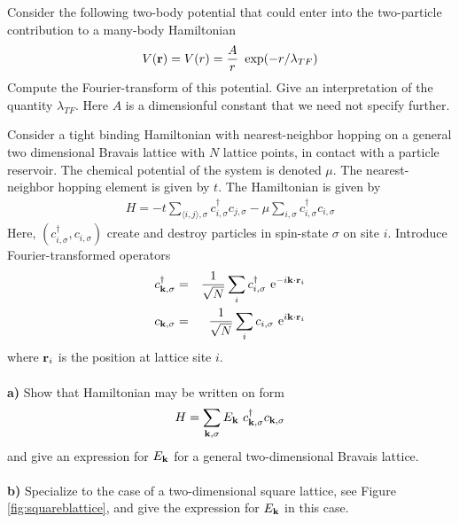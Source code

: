\begin{problem}
	
	Consider the following two-body potential that could enter into the two-particle contribution to a many-body Hamiltonian
	\begin{eqnarray}
		V({\bf r}) = V(r) = \frac{A}{r} ~ \exp(-r/\lambda_{TF}) \nonumber 
	\end{eqnarray} 
	Compute the Fourier-transform of this potential. Give an interpretation of the quantity $\lambda_{TF}$. Here $A$ is a dimensionful constant that we need not specify further. 
\end{problem}


\begin{problem}
	
	Consider a tight binding Hamiltonian with nearest-neighbor hopping on a general two dimensional Bravais lattice with $N$ lattice points, in contact with a particle reservoir. The chemical potential of the system is denoted $\mu$. The nearest-neighbor hopping element is given by $t$. The Hamiltonian is given by 
	\begin{eqnarray}
		H = - t \sum_{\langle i,j \rangle, \sigma} c^{\dagger}_{i,\sigma} c_{j,\sigma} - \mu   \sum_{ i, \sigma} c^{\dagger}_{i,\sigma} c_{i,\sigma} \nonumber 
	\end{eqnarray}
	Here, $(c^{\dagger}_{i,\sigma}, c_{i,\sigma})$ create and destroy particles in spin-state $\sigma$ on site $i$. 
	Introduce Fourier-transformed operators 
	\begin{eqnarray}
		c^{\dagger}_{{\bf k},\sigma} & = & \frac{1}{\sqrt{N}} \sum_{i} c^{\dagger}_{i,\sigma} ~ \mathrm{e}^{-i {\bf k} \cdot {\bf r}_i} \nonumber  \\
		c_{{\bf k},\sigma} & = & \frac{1}{\sqrt{N}} \sum_{i} c_{i,\sigma} ~ \mathrm{e}^{i {\bf k} \cdot {\bf r}_i} \nonumber
	\end{eqnarray}
	where ${\bf r}_i$ is the position at lattice site $i$. 
	\ \\
	\ \\
	{\bf a)} Show that Hamiltonian may be written on form
	\begin{eqnarray}
		H = \sum_{{\bf k}, \sigma} E_{\bf k} ~ c^{\dagger}_{{\bf k},\sigma} c_{{\bf k},\sigma}  \nonumber 
	\end{eqnarray}
	and give an expression for $E_{\bf k}$ for a general two-dimensional Bravais lattice. 
	\ \\
	\ \\
	{\bf b)} Specialize to the case of a two-dimensional square lattice, see Figure \ref{fig:squareblattice}, and give the expression for $E_{\bf k}$ in this case.
	

\end{problem}
